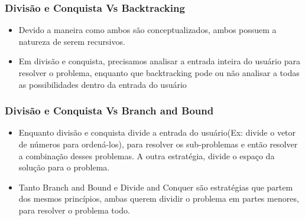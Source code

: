       \subsubsection{Divisão e Conquista Vs Backtracking}

      \begin{itemize}
          \item Devido a maneira como ambos são conceptualizados, ambos possuem a 
          natureza de serem recursivos.
          \item Em divisão e conquista, precisamos analisar a entrada inteira do usuário 
          para resolver o problema, enquanto que backtracking pode ou não analisar a todas 
          as possibilidades dentro da entrada do usuário
      \end{itemize}

      \subsubsection{Divisão e Conquista Vs Branch and Bound}

      \begin{itemize}
          \item Enquanto divisão e conquista divide a entrada do usuário(Ex: divide o vetor de 
          números para ordená-los), para resolver os sub-problemas e então resolver a combinação
          desses problemas. A outra estratégia, divide o espaço da solução para o problema.
          \item Tanto Branch and Bound e Divide and Conquer são estratégias que partem dos 
          mesmos princípios, ambas querem dividir o problema em partes menores, para resolver 
          o problema todo.
      \end{itemize}

    \nocite{divide-and-conquer}
    \nocite{closest-pair-of-points}
\newpage